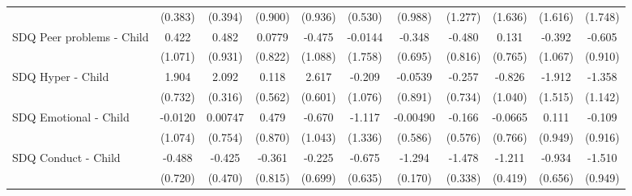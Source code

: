 {\begin{tabular}{l*{10}{c}}
            &     (0.383)         &     (0.394)         &     (0.900)         &     (0.936)         &     (0.530)         &     (0.988)         &     (1.277)         &     (1.636)         &     (1.616)         &     (1.748)         \\
\addlinespace
SDQ Peer problems - Child&       0.422         &       0.482         &      0.0779         &      -0.475         &     -0.0144         &      -0.348         &      -0.480         &       0.131         &      -0.392         &      -0.605         \\
            &     (1.071)         &     (0.931)         &     (0.822)         &     (1.088)         &     (1.758)         &     (0.695)         &     (0.816)         &     (0.765)         &     (1.067)         &     (0.910)         \\
\addlinespace
SDQ Hyper - Child&       1.904\sym{**} &       2.092\sym{***}&       0.118         &       2.617\sym{***}&      -0.209         &     -0.0539         &      -0.257         &      -0.826         &      -1.912         &      -1.358         \\
            &     (0.732)         &     (0.316)         &     (0.562)         &     (0.601)         &     (1.076)         &     (0.891)         &     (0.734)         &     (1.040)         &     (1.515)         &     (1.142)         \\
\addlinespace
SDQ Emotional - Child&     -0.0120         &     0.00747         &       0.479         &      -0.670         &      -1.117         &    -0.00490         &      -0.166         &     -0.0665         &       0.111         &      -0.109         \\
            &     (1.074)         &     (0.754)         &     (0.870)         &     (1.043)         &     (1.336)         &     (0.586)         &     (0.576)         &     (0.766)         &     (0.949)         &     (0.916)         \\
\addlinespace
SDQ Conduct - Child&      -0.488         &      -0.425         &      -0.361         &      -0.225         &      -0.675         &      -1.294\sym{***}&      -1.478\sym{***}&      -1.211\sym{**} &      -0.934         &      -1.510         \\
            &     (0.720)         &     (0.470)         &     (0.815)         &     (0.699)         &     (0.635)         &     (0.170)         &     (0.338)         &     (0.419)         &     (0.656)         &     (0.949)         \\
\bottomrule
\end{tabular}
}
